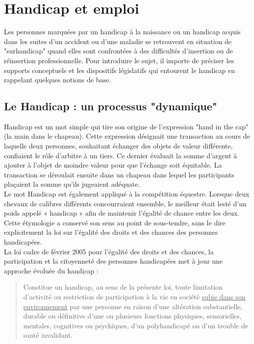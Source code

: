 \chapter{Handicap et emploi}
\label{handicap_emploi}

Les personnes marquées par un handicap à la naissance ou un handicap acquis dans les suites d'un accident ou d'une maladie se retrouvent en situation de "surhandicap" quand elles sont confrontées à des difficultés d'insertion ou de réinsertion professionnelle. Pour introduire le sujet, il importe de préciser les supports conceptuels et les dispositifs législatifs qui entourent le handicap en rappelant quelques notions de base.

\section{Le Handicap : un processus "dynamique"}
Handicap est un mot simple qui tire son origine de l'expression "hand in the cap" (la main dans le chapeau). Cette expression désignait une transaction au cours de laquelle deux personnes, souhaitant échanger des objets de valeur différente, confiaient le r\^ole d'arbitre à un tiers. Ce dernier évaluait la somme d'argent à ajouter à l'objet de moindre valeur pour que l'échange soit équitable. La transaction se déroulait ensuite dans un chapeau dans lequel les participants plaçaient la somme qu'ils jugeaient adéquate.\\

Le mot Handicap est également appliqué à la compétition équestre. Lorsque deux chevaux de calibres différents concourraient ensemble, le meilleur était lesté d’un poids appelé « handicap » afin de maintenir l’égalité de chance entre les deux.\\
Cette étymologie a conservé son sens au point de sous-tendre, sans le dire explicitement la loi sur l'égalité des droits et des chances des personnes handicapées.\\

\noindent La loi cadre de février 2005 pour l'égalité des droits et des chances, la participation et la citoyenneté des personnes handicapées met à jour une approche évoluée du handicap :

\begin{quotation}
\noindent Constitue un handicap, au sens de la présente loi, toute limitation d’activité ou restriction de participation à la vie en société \underline{subie dans son environnement} par une personne en raison d’une altération substantielle, durable ou définitive d’une ou plusieurs fonctions physiques, sensorielles, mentales, cognitives ou psychiques, d’un polyhandicapé ou d’un trouble de santé invalidant.\\
\end{quotation}


